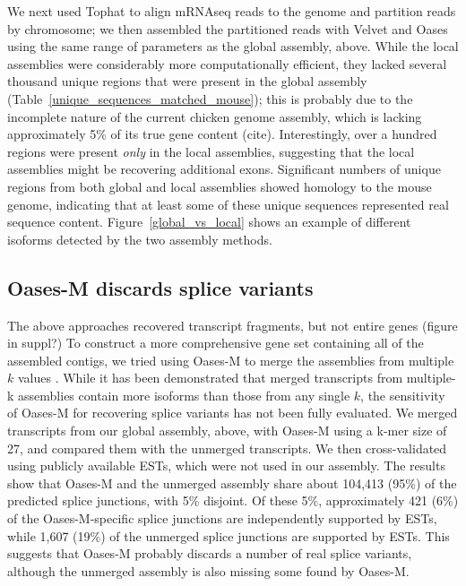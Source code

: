 \documentclass[10pt]{article}
\begin{document}
We next used Tophat to align mRNAseq reads to the genome and partition
reads by chromosome; we then assembled the partitioned reads with
Velvet and Oases using the same range of parameters as the global
assembly, above.  While the local assemblies were considerably more
computationally efficient, they lacked several thousand unique regions
that were present in the global assembly
(Table~\ref{unique_sequences_matched_mouse}); this is probably due to
the incomplete nature of the current chicken genome assembly, which is
lacking approximately 5\% of its true gene content (cite).
Interestingly, over a hundred regions were present {\em only} in the
local assemblies, suggesting that the local assemblies might be
recovering additional exons.  Significant numbers of unique regions
from both global and local assemblies showed homology to the mouse
genome, indicating that at least some of these unique sequences
represented real sequence content.  Figure~\ref{global_vs_local} shows
an example of different isoforms detected by the two assembly methods.



\subsection*{Oases-M discards splice variants}

The above approaches recovered transcript fragments, but not entire genes
(figure in suppl?)
To construct a more comprehensive gene set containing all of the
assembled contigs, we tried using Oases-M to merge the assemblies from
multiple $k$ values \cite{Schulz:2012je}.  While it has been
demonstrated that merged transcripts from multiple-k assemblies
contain more isoforms than those from any single $k$, the sensitivity
of Oases-M for recovering splice variants has not been fully
evaluated.
We merged transcripts from our global assembly, above,
with Oases-M using a k-mer size of 27, and compared them with the
unmerged transcripts.  We then cross-validated using publicly
available ESTs, which were not used in our assembly.
The results show that
Oases-M and the unmerged assembly share about 104,413 (95\%) of the predicted
splice junctions, with 5\% disjoint.  Of these 5\%,
approximately 421 (6\%) of the Oases-M-specific splice junctions are
independently supported by ESTs, while 1,607 (19\%) of the unmerged splice
junctions are supported by ESTs.
This suggests that Oases-M probably
discards a number of real splice variants, although the unmerged
assembly is also missing some found by Oases-M.
\end{document}
